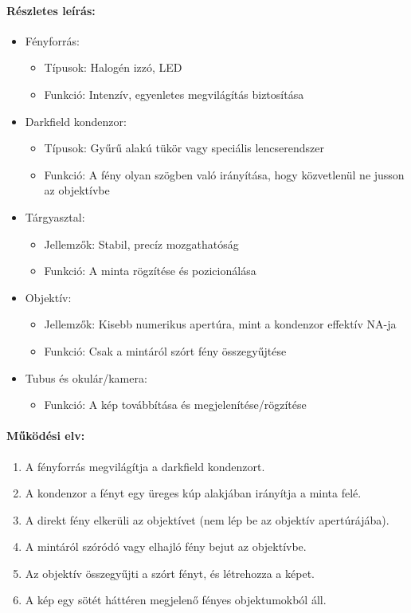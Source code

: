\documentclass[a4paper,12pt]{article}
\begin{document}
\paragraph{Részletes leírás:} \begin{itemize} \item Fényforrás: \begin{itemize} \item Típusok: Halogén izzó, LED \item Funkció: Intenzív, egyenletes megvilágítás biztosítása \end{itemize} \item Darkfield kondenzor: \begin{itemize} \item Típusok: Gyűrű alakú tükör vagy speciális lencserendszer \item Funkció: A fény olyan szögben való irányítása, hogy közvetlenül ne jusson az objektívbe \end{itemize} \item Tárgyasztal: \begin{itemize} \item Jellemzők: Stabil, precíz mozgathatóság \item Funkció: A minta rögzítése és pozicionálása \end{itemize} \item Objektív: \begin{itemize} \item Jellemzők: Kisebb numerikus apertúra, mint a kondenzor effektív NA-ja \item Funkció: Csak a mintáról szórt fény összegyűjtése \end{itemize} \item Tubus és okulár/kamera: \begin{itemize} \item Funkció: A kép továbbítása és megjelenítése/rögzítése \end{itemize} \end{itemize}

\paragraph{Működési elv:} \begin{enumerate} \item A fényforrás megvilágítja a darkfield kondenzort. \item A kondenzor a fényt egy üreges kúp alakjában irányítja a minta felé. \item A direkt fény elkerüli az objektívet (nem lép be az objektív apertúrájába). \item A mintáról szóródó vagy elhajló fény bejut az objektívbe. \item Az objektív összegyűjti a szórt fényt, és létrehozza a képet. \item A kép egy sötét háttéren megjelenő fényes objektumokból áll. \end{enumerate}
\end{document}
